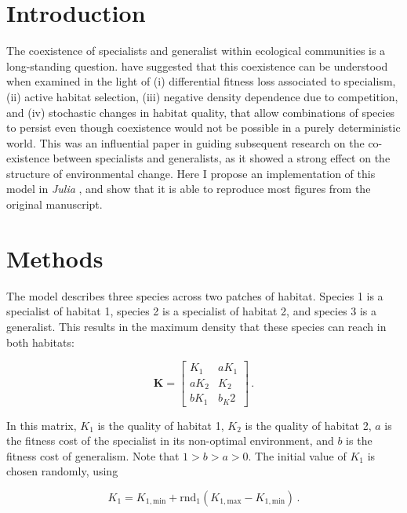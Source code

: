 \documentclass[10pt,a4paper,onecolumn]{article}
\begin{document}
\hypertarget{introduction}{%
\section{Introduction}\label{introduction}}

The coexistence of specialists and generalist within ecological
communities is a long-standing question. \textcite{wils94csg} have
suggested that this coexistence can be understood when examined in the
light of (i) differential fitness loss associated to specialism, (ii)
active habitat selection, (iii) negative density dependence due to
competition, and (iv) stochastic changes in habitat quality, that allow
combinations of species to persist even though coexistence would not be
possible in a purely deterministic world. This was an influential paper
in guiding subsequent research on the co-existence between specialists
and generalists, as it showed a strong effect on the structure of
environmental change. Here I propose an implementation of this model in
\emph{Julia} \autocite{beza17jfa}, and show that it is able to reproduce
most figures from the original manuscript.

\hypertarget{methods}{%
\section{Methods}\label{methods}}

The \textcite{wils94csg} model describes three species across two
patches of habitat. Species 1 is a specialist of habitat 1, species 2 is
a specialist of habitat 2, and species 3 is a generalist. This results
in the maximum density that these species can reach in both habitats:

\begin{equation}
\mathbf{K} = \begin{bmatrix}
  K_1 & aK_1 \\
  aK_2 & K_2 \\
  bK_1 & b_K2
\end{bmatrix} \,.
\end{equation}

In this matrix, \(K_1\) is the quality of habitat 1, \(K_2\) is the
quality of habitat 2, \(a\) is the fitness cost of the specialist in its
non-optimal environment, and \(b\) is the fitness cost of generalism.
Note that \(1 > b > a > 0\). The initial value of \(K_1\) is chosen
randomly, using

\[K_1 = K_{1,\text{min}} + \text{rnd}_1(K_{1,\text{max}}-K_{1,\text{min}})\,.\]
\end{document}
